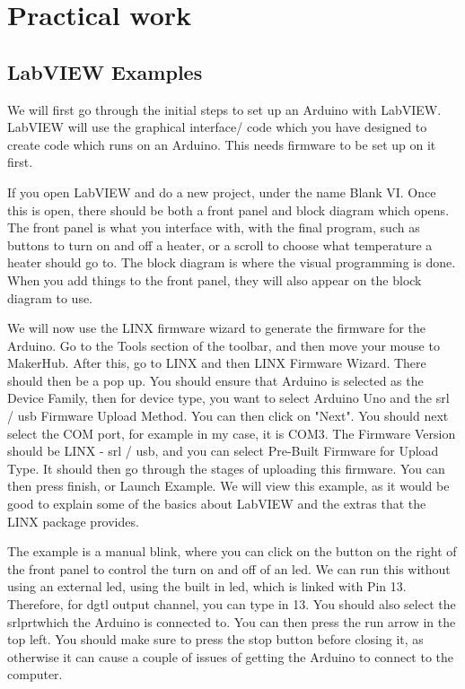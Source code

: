 \documentclass[a4paper,11pt]{report}
\begin{document}
\pagebreak

\section{Practical work}

\vspace*{1\baselineskip}

\subsection{LabVIEW Examples}

We will first go through the initial steps to set up an Arduino with LabVIEW. LabVIEW will use the graphical interface/ code which you have designed to create code which runs on an Arduino. This needs firmware to be set up on it first.

If you open LabVIEW and do a new project, under the name Blank VI. Once this is open, there should be both a front panel and block diagram which opens. The front panel is what you interface with, with the final program, such as buttons to turn on and off a heater, or a scroll to choose what temperature a heater should go to. The block diagram is where the visual programming is done. When you add things to the front panel, they will also appear on the block diagram to use.

We will now use the LINX firmware wizard to generate the firmware for the Arduino. Go to the Tools section of the toolbar, and then move your mouse to MakerHub. After this, go to LINX and then LINX Firmware Wizard. There should then be a pop up. You should ensure that Arduino is selected as the Device Family, then for device type, you want to select Arduino Uno and the \gls{srl} / \gls{usb} Firmware Upload Method. You can then click on "Next". You should next select the COM port, for example in my case, it is COM3. The Firmware Version should be LINX - \gls{srl} / \gls{usb}, and you can select Pre-Built Firmware for Upload Type. It should then go through the stages of uploading this firmware. You can then press finish, or Launch Example. We will view this example, as it would be good to explain some of the basics about LabVIEW and the extras that the LINX package provides.

The example is a manual blink, where you can click on the button on the right of the front panel to control the turn on and off of an \gls{led}. We can run this without using an external \gls{led}, using the built in \gls{led}, which is linked with Pin 13. Therefore, for \gls{dgtl} output channel, you can type in 13. You should also select the \gls{srl}\gls{prt}which the Arduino is connected to. You can then press the run arrow in the top left. You should make sure to press the stop button before closing it, as otherwise it can cause a couple of issues of getting the Arduino to connect to the computer.
\end{document}
